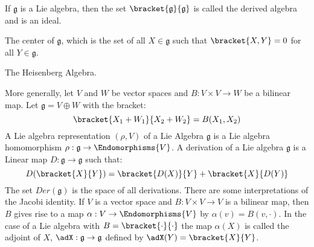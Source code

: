 \documentclass{book}                                                           %
\begin{document}
                \begin{example}
                    If $\mathfrak{g}$ is a Lie algebra, then the set
                    $\bracket{\mathfrak{g}}{\mathfrak{g}}$ is called the derived
                    algebra and is an ideal.
                \end{example}
                \begin{example}
                    The center of $\mathfrak{g}$, which is the set of all
                    $X\in\mathfrak{g}$ such that $\bracket{X,Y}=0$ for all
                    $Y\in\mathfrak{g}$.
                \end{example}
                \begin{example}
                    The Heisenberg Algebra.
                \end{example}
                More generally, let $V$ and $W$ be vector spaces and
                $B:V\times{V}\rightarrow{W}$ be a bilinear map. Let
                $\mathfrak{g}=V\oplus{W}$ with the bracket:
                \begin{equation}
                    \bracket{X_{1}+W_{1}}{X_{2}+W_{2}}=B(X_{1},X_{2})
                \end{equation}
                A Lie algebra representation $(\rho,V)$ of a Lie Algebra
                $\mathfrak{g}$ is a Lie algebra homomorphism
                $\rho:\mathfrak{g}\rightarrow\Endomorphisms{V}$. A derivation of
                a Lie algebra $\mathfrak{g}$ is a Linear map
                $D:\mathfrak{g}\rightarrow\mathfrak{g}$ such that:
                \begin{equation}
                    D(\bracket{X}{Y})=\bracket{D(X)}{Y}+\bracket{X}{D(Y)}
                \end{equation}
                The set $Der(\mathfrak{g})$ is the space of all derivations.
                There are some interpretations of the Jacobi identity. If $V$ is
                a vector space and $B:V\times{V}\rightarrow{V}$ is a bilinear
                map, then $B$ gives rise to a map
                $\alpha:V\rightarrow\Endomorphisms{V}$ by
                $\alpha(v)=B(v,\cdot)$. In the case of a Lie algebra with
                $B=\bracket{\cdot}{\cdot}$ the map $\alpha(X)$ is called the
                adjoint of $X$, $\adX:\mathfrak{g}\rightarrow\mathfrak{g}$
                defined by $\adX(Y)=\bracket{X}{Y}$.
\end{document}
